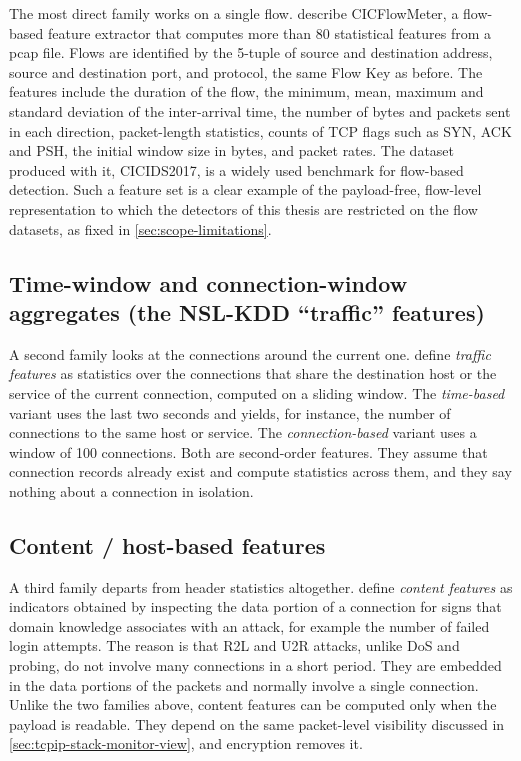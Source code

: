 The most direct family works on a single flow. \citet{sharafaldin2018cicids2017}
describe CICFlowMeter, a flow-based feature extractor that computes more than
80 statistical features from a pcap file. Flows are identified by the
5-tuple of source and destination address, source and destination port, and
protocol, the same Flow Key as before. The features include the duration of
the flow, the minimum, mean, maximum and standard deviation of the
inter-arrival time, the number of bytes and packets sent in each direction,
packet-length statistics, counts of TCP flags such as SYN, ACK and PSH, the
initial window size in bytes, and packet rates. The dataset produced with
it, CICIDS2017, is a widely used benchmark for flow-based detection. Such a
feature set is a clear example of the payload-free, flow-level
representation to which the detectors of this thesis are restricted on the
flow datasets, as fixed in \cref{sec:scope-limitations}.

\subsection{Time-window and connection-window aggregates (the NSL-KDD ``traffic'' features)}
\label{sec:time-window-connection-aggregates}

A second family looks at the connections around the current one.
\citet{tavallaee2009kddcup99} define \emph{traffic features} as statistics
over the connections that share the destination host or the service of the
current connection, computed on a sliding window. The \emph{time-based}
variant uses the last two seconds and yields, for instance, the number of
connections to the same host or service. The \emph{connection-based} variant
uses a window of 100 connections. Both are second-order features. They
assume that connection records already exist and compute statistics across
them, and they say nothing about a connection in isolation.

\subsection{Content / host-based features}
\label{sec:content-host-based-features}

A third family departs from header statistics altogether.
\citet{tavallaee2009kddcup99} define \emph{content features} as indicators
obtained by inspecting the data portion of a connection for signs that
domain knowledge associates with an attack, for example the number of
failed login attempts. The reason is that R2L and U2R attacks, unlike DoS
and probing, do not involve many connections in a short period. They are
embedded in the data portions of the packets and normally involve a single
connection. Unlike the two families above, content features can be computed
only when the payload is readable. They depend on the same packet-level
visibility discussed in \cref{sec:tcpip-stack-monitor-view}, and encryption
removes it.

